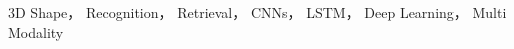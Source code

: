 \begin{Abstract}

    \begin{Keywords}
        3D Shape，  Recognition， Retrieval，  CNNs，  LSTM， Deep Learning， Multi Modality
    \end{Keywords}
\end{Abstract}

